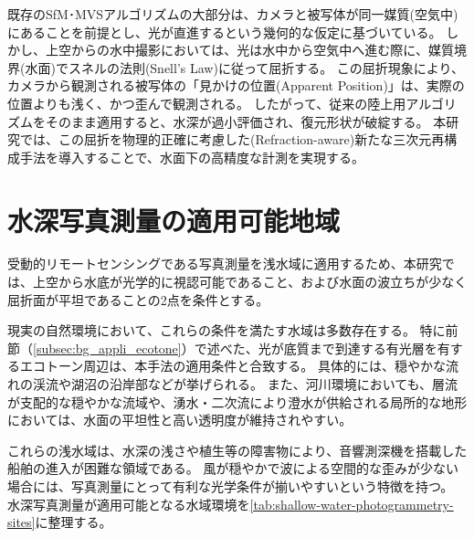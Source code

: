 既存のSfM･MVSアルゴリズムの大部分は、カメラと被写体が同一媒質(空気中)にあることを前提とし、光が直進するという幾何的な仮定に基づいている。
しかし、上空からの水中撮影においては、光は水中から空気中へ進む際に、媒質境界(水面)でスネルの法則(Snell's Law)に従って屈折する。
この屈折現象により、カメラから観測される被写体の「見かけの位置(Apparent Position)」は、実際の位置よりも浅く、かつ歪んで観測される。
したがって、従来の陸上用アルゴリズムをそのまま適用すると、水深が過小評価され、復元形状が破綻する。
本研究では、この屈折を物理的正確に考慮した(Refraction-aware)新たな三次元再構成手法を導入することで、水面下の高精度な計測を実現する。



\section{水深写真測量の適用可能地域}\label{sec:photo-bathy-regions}
受動的リモートセンシングである写真測量を浅水域に適用するため、本研究では、上空から水底が光学的に視認可能であること、および水面の波立ちが少なく屈折面が平坦であることの2点を条件とする。

現実の自然環境において、これらの条件を満たす水域は多数存在する。
特に前節（\cref{subsec:bg_appli_ecotone}）で述べた、光が底質まで到達する有光層を有するエコトーン周辺は、本手法の適用条件と合致する。
具体的には、穏やかな流れの渓流や湖沼の沿岸部などが挙げられる。
また、河川環境においても、層流が支配的な穏やかな流域や、湧水・二次流により澄水が供給される局所的な地形においては、水面の平坦性と高い透明度が維持されやすい。

これらの浅水域は、水深の浅さや植生等の障害物により、音響測深機を搭載した船舶の進入が困難な領域である。
風が穏やかで波による空間的な歪みが少ない場合には、写真測量にとって有利な光学条件が揃いやすいという特徴を持つ。
水深写真測量が適用可能となる水域環境を\cref{tab:shallow-water-photogrammetry-sites}に整理する。

